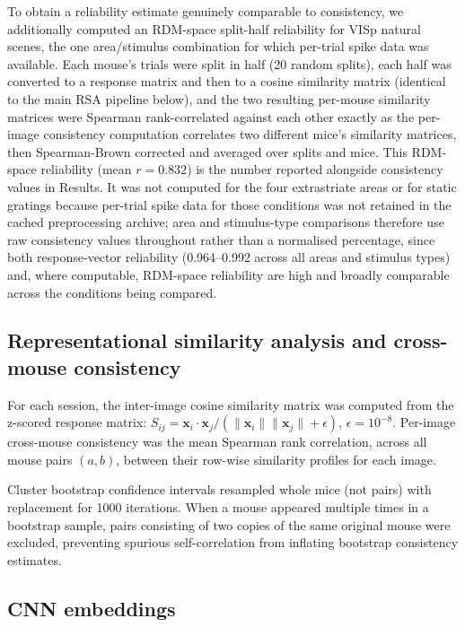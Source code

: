 \documentclass[11pt,onecolumn]{article}
\begin{document}
To obtain a reliability estimate genuinely comparable to consistency, we
additionally computed an RDM-space split-half reliability for VISp
natural scenes, the one area/stimulus combination for which per-trial
spike data was available.  Each mouse's trials were split in half (20
random splits), each half was converted to a response matrix and then to
a cosine similarity matrix (identical to the main RSA pipeline below),
and the two resulting per-mouse similarity matrices were Spearman
rank-correlated against each other exactly as the per-image consistency
computation correlates two different mice's similarity matrices, then
Spearman-Brown corrected and averaged over splits and mice.  This
RDM-space reliability (mean $r = 0.832$) is the number reported alongside
consistency values in Results.  It was not computed for the four
extrastriate areas or for static gratings because per-trial spike data
for those conditions was not retained in the cached preprocessing
archive; area and stimulus-type comparisons therefore use raw consistency
values throughout rather than a normalised percentage, since both
response-vector reliability (0.964--0.992 across all areas and stimulus
types) and, where computable, RDM-space reliability are high and broadly
comparable across the conditions being compared.

\subsection{Representational similarity analysis and cross-mouse
consistency}

For each session, the inter-image cosine similarity matrix was computed
from the z-scored response matrix:
$S_{ij} = \mathbf{x}_i \cdot \mathbf{x}_j /
(\|\mathbf{x}_i\| \|\mathbf{x}_j\| + \epsilon)$,
$\epsilon = 10^{-8}$.  Per-image cross-mouse consistency was the mean
Spearman rank correlation, across all mouse pairs $(a,b)$, between their
row-wise similarity profiles for each image.

Cluster bootstrap confidence intervals resampled whole mice (not pairs)
with replacement for 1000 iterations.  When a mouse appeared multiple
times in a bootstrap sample, pairs consisting of two copies of the same
original mouse were excluded, preventing spurious self-correlation from
inflating bootstrap consistency estimates.

\subsection{CNN embeddings}
\end{document}

